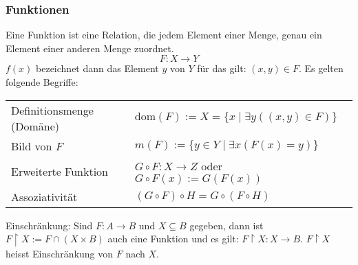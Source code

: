 \subsubsection{Funktionen}
Eine Funktion ist eine Relation, die jedem Element einer Menge, genau ein Element einer anderen Menge zuordnet.
\begin{equation*}
	F: X \rightarrow Y
\end{equation*}
$f(x)$ bezeichnet dann das Element $y$ von $Y$ für das gilt: $(x, y) \in F$.
Es gelten folgende Begriffe:
\settowidth{\MyLenA}{Definitionsmenge (Domäne)~~}
\begin{tabular}{@{}p{\the\MyLenA}%
				@{}p{\linewidth-\the\MyLenA}}
	Definitionsmenge (Domäne) 	& $\mbox{dom}(F) := X = \{x \mid \exists y ((x, y) \in F)\}$\\
	Bild von $F$			  	& $m(F) := \{y \in Y \mid \exists x (F(x) = y)\}$\\
	Erweiterte Funktion			& $G \circ F: X \rightarrow Z$ oder $G \circ F(x) := G(F(x))$\\
	Assoziativität				& $(G \circ F) \circ H = G \circ (F \circ H)$\\
\end{tabular}

Einschränkung: Sind $F: A \rightarrow B$ und $X \subseteq B$ gegeben, dann ist $F \upharpoonright X := F \cap (X \times B)$
auch eine Funktion und es gilt: $F \upharpoonright X : X \rightarrow B$. $F \upharpoonright X$ heisst Einschränkung
von $F$ nach $X$.